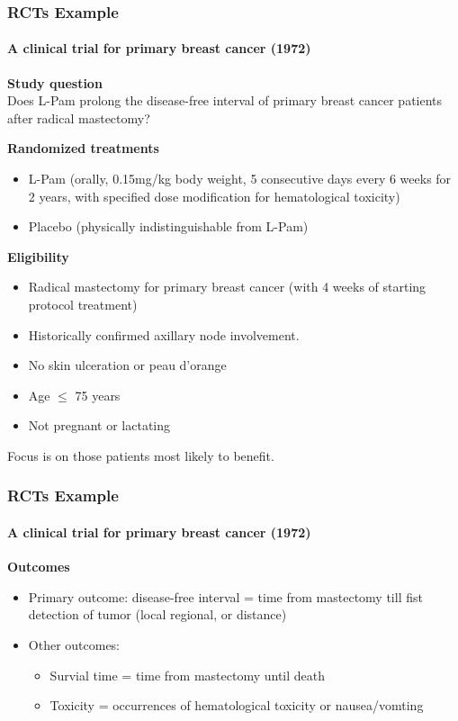 \documentclass[table,10pt]{beamer}
\begin{document}
\begin{CJK*}{UTF8}{gbsn}
\begin{frame}[t]
\frametitle{RCTs Example}
\framesubtitle{A clinical trial for primary breast cancer (1972)}
\textbf{Study question}\\
Does L-Pam prolong the disease-free interval of primary breast cancer patients after radical mastectomy?

\textbf{Randomized treatments}\\
\begin{itemize}
	\item L-Pam (orally, 0.15mg/kg body weight, 5 consecutive days every 6 weeks for 2 years, with 
		specified dose modification for hematological toxicity)
	\item Placebo (physically indistinguishable from L-Pam)
\end{itemize}

\textbf{Eligibility}
\begin{itemize}
	\item Radical mastectomy for primary breast cancer (with 4 weeks of starting protocol treatment)
	\item Historically confirmed axillary node involvement.
	\item No skin ulceration or peau d'orange
	\item Age $\le$ 75 years
	\item Not pregnant or lactating
\end{itemize}
Focus is on those patients most likely to benefit.
\end{frame}


\begin{frame}[t]
\frametitle{RCTs Example}
\framesubtitle{A clinical trial for primary breast cancer (1972)}
\textbf{Outcomes}
\begin{itemize}
	\item Primary outcome: disease-free interval = time from mastectomy till fist detection of tumor (local 
		regional, or distance)
	\item Other outcomes:
	\begin{itemize}
		\item Survial time = time from mastectomy until death
		\item Toxicity = occurrences of hematological toxicity or nausea/vomting
	\end{itemize}
\end{itemize}
\end{frame}


\end{CJK*}
\end{document}
